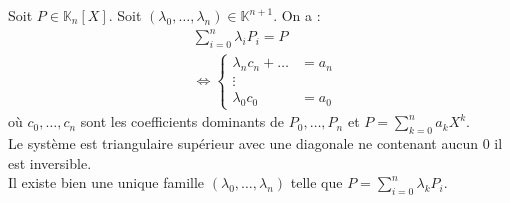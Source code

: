 \documentclass[../main.tex]{subfiles}
\begin{document}
\noindent Soit $P \in \mathbb{K}_n[X]$. Soit $(\lambda_0, \ldots, \lambda_n) \in \mathbb{K}^{n+1}$. On a : 
\begin{align*}
    &\sum_{i=0}^{n} \lambda_i P_i = P \\
    &\Leftrightarrow \begin{cases}
        \lambda_n c_n + \ldots &= a_n \\
        \vdots \\
        \lambda_0 c_0 &= a_0
    \end{cases}
\end{align*}
où $c_0, \ldots, c_n$ sont les coefficients dominants de $P_0, \ldots, P_n$ et $P = \sum\limits_{k=0}^{n} a_k X^k$. \\
Le système est triangulaire supérieur avec une diagonale ne contenant aucun $0$ il est inversible. \\
Il existe bien une unique famille $(\lambda_0, \ldots, \lambda_n)$ telle que $P = \sum\limits_{i=0}^{n} \lambda_k P_i$.
\end{document}
